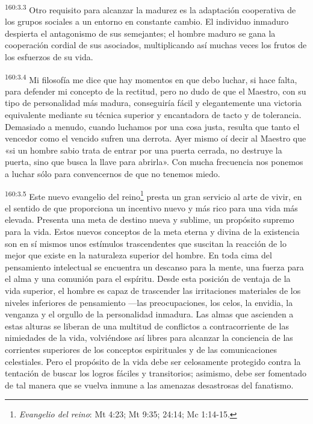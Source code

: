 \par 
\textsuperscript{160:3.3} Otro requisito para alcanzar la madurez es la adaptación cooperativa de los grupos sociales a un entorno en constante cambio. El individuo inmaduro despierta el antagonismo de sus semejantes; el hombre maduro se gana la cooperación cordial de sus asociados, multiplicando así muchas veces los frutos de los esfuerzos de su vida.

\par 
\textsuperscript{160:3.4} Mi filosofía me dice que hay momentos en que debo luchar, si hace falta, para defender mi concepto de la rectitud, pero no dudo de que el Maestro, con su tipo de personalidad más madura, conseguiría fácil y elegantemente una victoria equivalente mediante su técnica superior y encantadora de tacto y de tolerancia. Demasiado a menudo, cuando luchamos por una cosa justa, resulta que tanto el vencedor como el vencido sufren una derrota. Ayer mismo oí decir al Maestro que «si un hombre sabio trata de entrar por una puerta cerrada, no destruye la puerta, sino que busca la llave para abrirla». Con mucha frecuencia nos ponemos a luchar sólo para convencernos de que no tenemos miedo.

\par 
\textsuperscript{160:3.5} Este nuevo evangelio del reino\footnote{\textit{Evangelio del reino}: Mt 4:23; Mt 9:35; 24:14; Mc 1:14-15.} presta un gran servicio al arte de vivir, en el sentido de que proporciona un incentivo nuevo y más rico para una vida más elevada. Presenta una meta de destino nueva y sublime, un propósito supremo para la vida. Estos nuevos conceptos de la meta eterna y divina de la existencia son en sí mismos unos estímulos trascendentes que suscitan la reacción de lo mejor que existe en la naturaleza superior del hombre. En toda cima del pensamiento intelectual se encuentra un descanso para la mente, una fuerza para el alma y una comunión para el espíritu. Desde esta posición de ventaja de la vida superior, el hombre es capaz de trascender las irritaciones materiales de los niveles inferiores de pensamiento ---las preocupaciones, los celos, la envidia, la venganza y el orgullo de la personalidad inmadura. Las almas que ascienden a estas alturas se liberan de una multitud de conflictos a contracorriente de las nimiedades de la vida, volviéndose así libres para alcanzar la conciencia de las corrientes superiores de los conceptos espirituales y de las comunicaciones celestiales. Pero el propósito de la vida debe ser celosamente protegido contra la tentación de buscar los logros fáciles y transitorios; asimismo, debe ser fomentado de tal manera que se vuelva inmune a las amenazas desastrosas del fanatismo.

